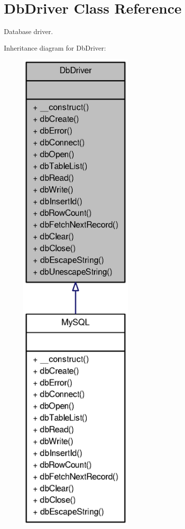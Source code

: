 \section{DbDriver Class Reference}
\label{classDbDriver}


Database driver.  




Inheritance diagram for DbDriver:\nopagebreak
\begin{figure}[H]
\begin{center}
\leavevmode
\includegraphics[width=162pt]{classDbDriver__inherit__graph}
\end{center}
\end{figure}
